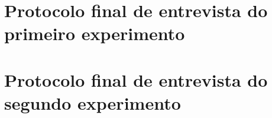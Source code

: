 \chapter{Protocolo final de entrevista do primeiro experimento}

\chapter{Protocolo final de entrevista do segundo experimento}
